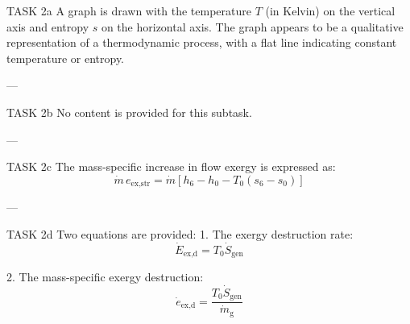 TASK 2a  
A graph is drawn with the temperature \( T \) (in Kelvin) on the vertical axis and entropy \( s \) on the horizontal axis. The graph appears to be a qualitative representation of a thermodynamic process, with a flat line indicating constant temperature or entropy.

---

TASK 2b  
No content is provided for this subtask.

---

TASK 2c  
The mass-specific increase in flow exergy is expressed as:  
\[
\dot{m} \, e_{\text{ex},\text{str}} = \dot{m} \left[ h_6 - h_0 - T_0 (s_6 - s_0) \right]
\]

---

TASK 2d  
Two equations are provided:  
1. The exergy destruction rate:  
\[
\dot{E}_{\text{ex,d}} = T_0 \dot{S}_{\text{gen}}
\]

2. The mass-specific exergy destruction:  
\[
\dot{e}_{\text{ex,d}} = \frac{T_0 \dot{S}_{\text{gen}}}{\dot{m}_{\text{g}}}
\]